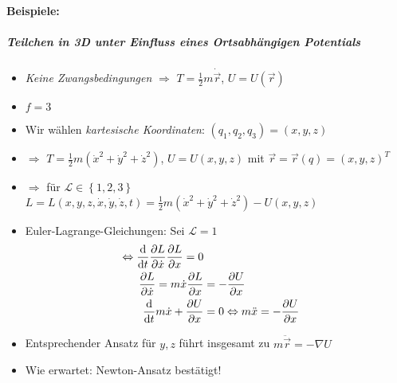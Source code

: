 \paragraph*{Beispiele:}
\subparagraph{Teilchen in 3D unter Einfluss eines Ortsabhängigen  Potentials}
\begin{itemize}
\item \emph{Keine Zwangsbedingungen} $\Rightarrow$
  $T = \frac{1}{2}m\dot\vec{r}$, $U=U \left( \vec{r} \right)$
\item $f=3$
\item Wir wählen \emph{kartesische Koordinaten}: $\left( q_1,q_2,q_3 \right) = (x,y,z)$
\item $\Rightarrow$
  $T = \frac{1}{2}m \left( \dot{x}^2 + \dot{y}^2 + \dot{z}^2 \right)$,
  $U = U(x,y,z)$ mit
  $\vec{r} = \vec{r}(q) = (x,y,z)^T$
\item $\Rightarrow$ für $\mathcal{L}\in \left\{ 1,2,3 \right\}$
  $L = L(x,y,z,\dot{x},\dot{y},\dot{z},t) = \frac{1}{2}m \left(
    \dot{x}^2 + \dot{y}^2 + \dot{z}^2 \right) - U(x,y,z)$
\item Euler-Lagrange-Gleichungen: Sei $\mathcal{L}=1$
\begin{align*}
  \Leftrightarrow
  \frac{\text{d} }{\text{d} t}\frac{\partial L}{\partial \dot{x}} \frac{\partial L}{\partial x} = 0\\
  \frac{\partial L}{\partial \dot{x}} = m\dot{x}
  \frac{\partial L}{\partial x}
&= - \frac{\partial U}{\partial x}\\
  \frac{\text{d} }{\text{d} t}m\dot{x} + \frac{\partial U}{\partial x}
&= 0
  \Leftrightarrow m \ddot{x} = - \frac{\partial U}{\partial x}
\end{align*}
\item Entsprechender Ansatz für $y,z$ führt insgesamt zu $m\ddot\vec{r}=-\nabla U$
\item Wie erwartet: Newton-Ansatz bestätigt!
\end{itemize}

